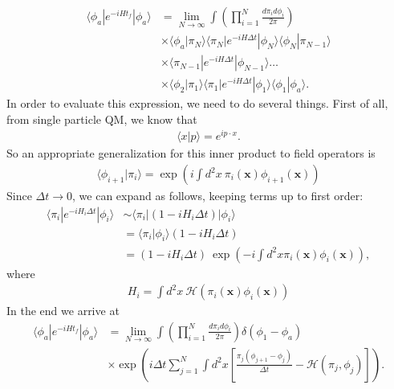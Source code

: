         \begin{align}
            \langle \phi_a| e^{- i H t_f} | \phi_a \rangle &= \lim_{N\rightarrow \infty} \int \left( \prod_{i=1}^{N} \frac{d\pi_i d\phi_i}{2\pi} \right) \nonumber \\
            &\times \langle \phi_a | \pi_N \rangle \langle \pi_N|  e^{-i H \Delta t}| \phi_N \rangle \langle \phi_N | \pi_{N-1} \rangle \nonumber \\
            &\times \langle \pi_{N-1} | e^{-i H \Delta t} | \phi_{N-1} \rangle \dots \nonumber \\
            &\times \langle \phi_2 | \pi_1 \rangle \langle \pi_1 | e^{-i H \Delta t} | \phi_1 \rangle \langle \phi_1 |\phi_a \rangle.
        \end{align}
        In order to evaluate this expression, we need to do several things. First of all, from single particle QM, we know that 
        \begin{align}
            \langle x | p \rangle = e^{i p \cdot x}.
        \end{align}
        So an appropriate generalization for this inner product to field operators is 
        \begin{align}
            \langle \phi_{i+1}| \pi_i \rangle = \exp \left(i \int d^2 x \ \pi_i(\bm{x}) \phi_{i+1}(\bm{x}) \right)
        \end{align}
        Since $\Delta t \rightarrow 0$, we can expand as follows, keeping terms up to first order:
        \begin{align}
            \langle \pi_i | e^{-i H_i \Delta t} | \phi_i \rangle &\sim \langle \pi_i | (1- i H_i \Delta t ) | \phi_i \rangle \nonumber \\
            &= \langle \pi_i | \phi_i \rangle (1 - i H_i \Delta t) \nonumber \\
            & = (1-i H_i \Delta t) \ \exp\left(-i \int d^2x \pi_i(\bm{x}) \phi_i (\bm{x})  \right),
        \end{align}
        where
        \begin{align}
            H_i = \int d^2 x \ \mathcal{H}\left(\pi_i (\bm{x}) \phi_i (\bm{x}) \right)
        \end{align}
        In the end we arrive at 
        \begin{align}
            \langle \phi_a | e^{-i H t_f} | \phi_a \rangle &= \lim_{N\rightarrow \infty} \int \left( \prod_{i=1}^N \frac{d \pi_i d\phi_i}{2\pi} \right) \delta \left(\phi_1 -\phi_a \right) \nonumber \\
            &\times \exp \left(i \Delta t \sum_{j=1}^{N} \int d^2x \left[\frac{\pi_j (\phi_{j+1} -\phi_j)}{\Delta t} - \mathcal{H}(\pi_j, \phi_j) \right] \right).
        \end{align}
